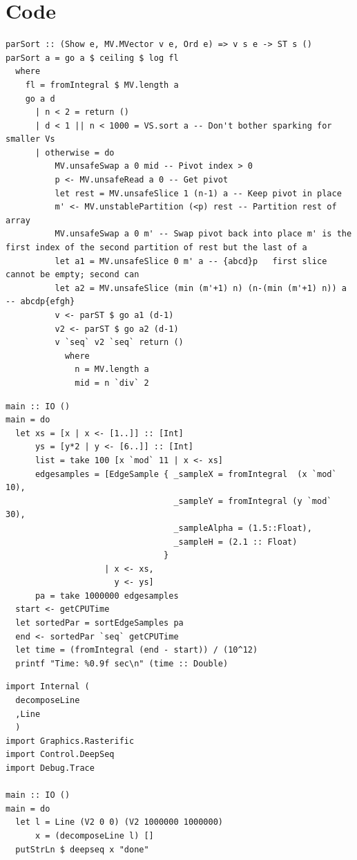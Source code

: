 \documentclass[12pt, a4paper]{article}
\begin{document}
\section{Code}
\begin{lstlisting}[label={lst:parsort}, caption={Parallel Sorting}]
parSort :: (Show e, MV.MVector v e, Ord e) => v s e -> ST s ()
parSort a = go a $ ceiling $ log fl
  where
    fl = fromIntegral $ MV.length a
    go a d
      | n < 2 = return ()
      | d < 1 || n < 1000 = VS.sort a -- Don't bother sparking for smaller Vs
      | otherwise = do
          MV.unsafeSwap a 0 mid -- Pivot index > 0
          p <- MV.unsafeRead a 0 -- Get pivot
          let rest = MV.unsafeSlice 1 (n-1) a -- Keep pivot in place
          m' <- MV.unstablePartition (<p) rest -- Partition rest of array
          MV.unsafeSwap a 0 m' -- Swap pivot back into place m' is the first index of the second partition of rest but the last of a
          let a1 = MV.unsafeSlice 0 m' a -- {abcd}p   first slice cannot be empty; second can
          let a2 = MV.unsafeSlice (min (m'+1) n) (n-(min (m'+1) n)) a -- abcdp{efgh}
          v <- parST $ go a1 (d-1)
          v2 <- parST $ go a2 (d-1)
          v `seq` v2 `seq` return ()
            where
              n = MV.length a
              mid = n `div` 2
\end{lstlisting}%


\begin{lstlisting}[label={lst:sorting}]
main :: IO ()
main = do
  let xs = [x | x <- [1..]] :: [Int]
      ys = [y*2 | y <- [6..]] :: [Int]
      list = take 100 [x `mod` 11 | x <- xs]
      edgesamples = [EdgeSample { _sampleX = fromIntegral  (x `mod` 10),
                                  _sampleY = fromIntegral (y `mod` 30),
                                  _sampleAlpha = (1.5::Float),
                                  _sampleH = (2.1 :: Float)
                                }
                    | x <- xs,
                      y <- ys]
      pa = take 1000000 edgesamples
  start <- getCPUTime
  let sortedPar = sortEdgeSamples pa
  end <- sortedPar `seq` getCPUTime
  let time = (fromIntegral (end - start)) / (10^12)
  printf "Time: %0.9f sec\n" (time :: Double)
\end{lstlisting}

\begin{lstlisting}[caption={Decomposing a very long single line.}, label={lst:singleline}]
import Internal (
  decomposeLine
  ,Line
  )
import Graphics.Rasterific
import Control.DeepSeq
import Debug.Trace

main :: IO ()
main = do
  let l = Line (V2 0 0) (V2 1000000 1000000)
      x = (decomposeLine l) []
  putStrLn $ deepseq x "done"
\end{lstlisting}
\end{document}
